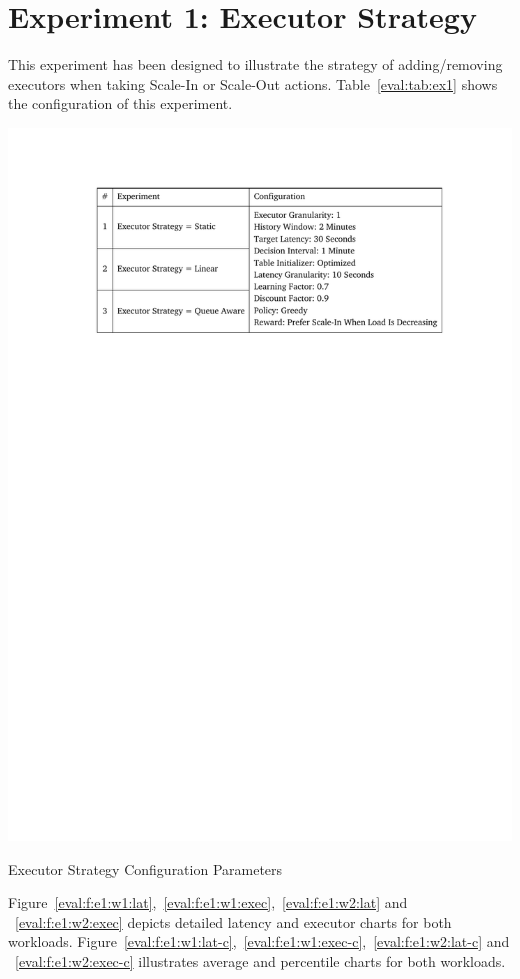 \section{Experiment 1: Executor Strategy}
This experiment has been designed to illustrate the strategy of adding/removing executors when taking Scale-In or Scale-Out actions. Table~\ref{eval:tab:ex1} shows the configuration of this experiment.
\begin{table}[h]
    \includegraphics[clip,trim=3.6cm 21.18cm 2.75cm 2.5cm]{tables/ex1.pdf}
    \centering
    \caption{Executor Strategy Configuration Parameters}
    \label{eval:tab:ex1}
\end{table}

Figure~\ref{eval:f:e1:w1:lat},~\ref{eval:f:e1:w1:exec},~\ref{eval:f:e1:w2:lat} and ~\ref{eval:f:e1:w2:exec} depicts detailed latency and executor charts for both workloads. Figure~\ref{eval:f:e1:w1:lat-c},~\ref{eval:f:e1:w1:exec-c},~\ref{eval:f:e1:w2:lat-c} and ~\ref{eval:f:e1:w2:exec-c} illustrates average and percentile charts for both workloads.

